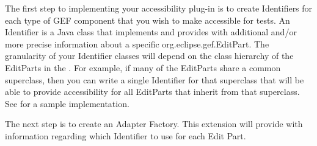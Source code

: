 The first step to implementing your accessibility plug-in is to create Identifiers for each type of GEF component that you wish to make accessible for \app{} tests. An Identifier is a Java class that implements  and provides \app{} with additional and/or more precise information about a specific org.eclipse.gef.EditPart. The granularity of your Identifier classes will depend on the class hierarchy of the EditParts in the \gdaut{}. For example, if many of the EditParts share a common superclass, then you can write a single Identifier for that superclass that will be able to provide accessibility for all EditParts that inherit from that superclass. See  for a sample implementation.

The next step is to create an Adapter Factory. This extension will provide \app{} with information regarding which Identifier to use for each Edit Part.
